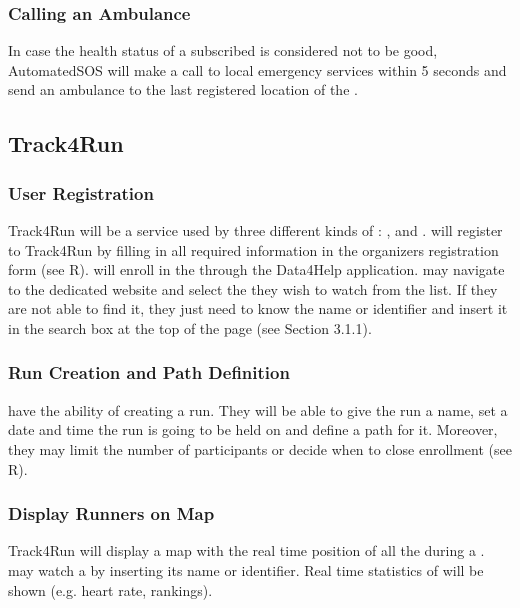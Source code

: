 \documentclass[../../rasd.tex]{subfiles}
\begin{document}
				\subsubsection{Calling an Ambulance}
				In case the health status of a subscribed  is considered not to be good, AutomatedSOS will make a call to local emergency services within 5 seconds and send an ambulance to the last registered location of the .

			\subsection{Track4Run}
				
				\subsubsection{User Registration}
				Track4Run will be a service used by three different kinds of : ,  and . will register to Track4Run by filling in all required information in the organizers registration form (see R).  will enroll in the  through the Data4Help application.  may navigate to the  dedicated website and select the  they wish to watch from the list. If they are not able to find it, they just need to know the  name or identifier and insert it in the search box at the top of the page (see Section 3.1.1).
				
				\subsubsection{Run Creation and Path Definition}
				 have the ability of creating a run. They will be able to give the run a name, set a date and time the run is going to be held on and define a path for it. Moreover, they may limit the number of participants or decide when to close enrollment (see R).
				
				\subsubsection{Display Runners on Map}

				Track4Run will display a map with the real time position of all the  during a .  may watch a  by inserting its name or identifier. Real time statistics of  will be shown (e.g. heart rate, rankings). 
\end{document}

